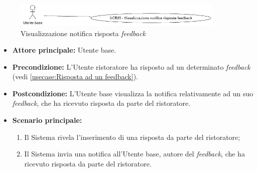 \label{usecase:Visualizzazione notifica risposta feedback}

\begin{figure}[h]
	\centering
	\includegraphics[width=0.9\textwidth]{./uml/UCB20.png} 
	\caption{Visualizzazione notifica risposta \textit{feedback}}
	\label{fig:UCB19}
  \end{figure}

\begin{itemize}
	\item \textbf{Attore principale:} Utente base.

	\item \textbf{Precondizione:} L'Utente ristoratore ha risposto ad un determinato \textit{feedback} (vedi \autoref{usecase:Risposta ad un feedback}).


	\item \textbf{Postcondizione:} L'Utente base visualizza la notifica relativamente ad un suo \textit{feedback}, che ha ricevuto risposta da parte del ristoratore.

	\item \textbf{Scenario principale:}
	      \begin{enumerate}
		      \item Il Sistema rivela l'inserimento di una risposta da parte del ristoratore;

		      \item Il Sistema invia una notifica all'Utente base, autore del \textit{feedback}, che ha ricevuto risposta da parte del ristoratore.
	      \end{enumerate}
\end{itemize}
